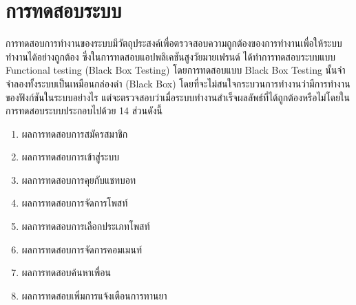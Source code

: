 \chapter{การทดสอบระบบ}

การทดสอบการทำงานของระบบมีวัตถุประสงค์เพื่อตรวจสอบความถูกต้องของการทำงานเพื่อให้ระบบทำงานได้อย่างถูกต้อง ซึ่งในการทดสอบแอปพลิเคชันสูงวัยมายเฟรนด์ ได้ทำการทดสอบระบบแบบ Functional testing (Black Box Testing) โดยการทดสอบแบบ Black Box Testing นั้นจำจำลองทั้งระบบเป็นเหมือนกล่องดำ (Black Box)  โดยที่จะไม่สนใจกระบวนการทำงานว่ามีการทำงานของฟังก์ชันในระบบอย่างไร แต่จะตรวจสอบว่าเมื่อระบบทำงานสำเร็จผลลัพธ์ที่ได้ถูกต้องหรือไม่โดยในการทดสอบระบบประกอบไปด้วย 14 ส่วนดังนี้
\begin{enumerate}[label=5.\arabic*)]
	\item ผลการทดสอบการสมัครสมาชิก
	\item ผลการทดสอบการเข้าสู่ระบบ
	\item ผลการทดสอบการคุยกับแชทบอท
	\item ผลการทดสอบการจัดการโพสท์
	\item ผลการทดสอบการเลือกประเภทโพสท์
	\item ผลการทดสอบการจัดการคอมเมนท์
	\item ผลการทดสอบค้นหาเพื่อน
	\item ผลการทดสอบเพิ่มการแจ้งเตือนการทานยา
\end{enumerate}


